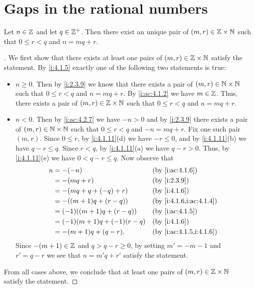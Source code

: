 \section{Gaps in the rational numbers}\label{i:sec:4.4}

\begin{ac}\label{i:ac:4.4.1}
  Let \(n \in \mathbb{Z}\) and let \(q \in \mathbb{Z}^+\).
  Then there exist an unique pair of \((m, r) \in \mathbb{Z} \times \mathbb{N}\) such that \(0 \leq r < q\) and \(n = mq + r\).
\end{ac}

\begin{proof}[]
  We first show that there exists at least one pairs of \((m, r) \in \mathbb{Z} \times \mathbb{N}\) satisfy the statement.
  By \cref{i:4.1.5} exactly one of the following two statements is true:
  \begin{itemize}
    \item \(n \geq 0\).
          Then by \cref{i:2.3.9} we know that there exists a pair of \((m, r) \in \mathbb{N} \times \mathbb{N}\) such that \(0 \leq r < q\) and \(n = mq + r\).
          By \cref{i:ac:4.1.2} we have \(m \in \mathbb{Z}\).
          Thus, there exists a pair of \((m, r) \in \mathbb{Z} \times \mathbb{N}\) such that \(0 \leq r < q\) and \(n = mq + r\).
    \item \(n < 0\).
          Then by \cref{i:ac:4.2.7} we have \(-n > 0\) and by \cref{i:2.3.9} there exists a pair of \((m, r) \in \mathbb{N} \times \mathbb{N}\) such that \(0 \leq r < q\) and \(-n = mq + r\).
          Fix one such pair \((m, r)\).
          Since \(0 \leq r\), by \cref{i:4.1.11}(d) we have \(-r \leq 0\), and by \cref{i:4.1.11}(b) we have \(q - r \leq q\).
          Since \(r < q\), by \cref{i:4.1.11}(a) we have \(q - r > 0\).
          Thus, by \cref{i:4.1.11}(e) we have \(0 < q - r \leq q\).
          Now observe that
          \begin{align*}
            n & = -(-n)                         &  & \by{i:ac:4.1.6}         \\
              & = -(mq + r)                     &  & \by{i:2.3.9}            \\
              & = -(mq + q + (-q) + r)          &  & \by{i:4.1.6}            \\
              & = -((m + 1) q + (r - q))        &  & \by{i:4.1.6,i:ac:4.1.4} \\
              & = (-1) ((m + 1) q + (r - q))    &  & \by{i:ac:4.1.5}         \\
              & = (-1) (m + 1) q + (-1) (r - q) &  & \by{i:4.1.6}            \\
              & = -(m + 1) q + (q - r).         &  & \by{i:ac:4.1.5,i:4.1.6}
          \end{align*}
          Since \(-(m + 1) \in \mathbb{Z}\) and \(q > q - r \geq 0\), by setting \(m' = -m - 1\) and \(r' = q - r\) we see that \(n = m'q + r'\) satisfy the statement.
  \end{itemize}
  From all cases above, we conclude that at least one pairs of \((m, r) \in \mathbb{Z} \times \mathbb{N}\) satisfy the statement.


\end{proof}
